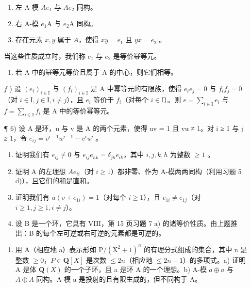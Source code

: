 \begin{enumerate}
\def\labelenumi{(\roman{enumi})}
\item
  左 A-模 \(Ae_{1}\) 与 \(Ae_{2}\) 同构。
\item
  右 A-模 \(e_1\mathrm{A}\) 与 \(e_2\mathrm{A}\) 同构。
\item
  存在元素 \(x, y\) 属于 \(A\)，使得 \(xy = e_1\) 且 \(yx = e_2\) 。
\end{enumerate}

当这些性质成立时，我们称 \(e_{1}\) 与 \(e_{2}\) 是等价幂等元。

\begin{enumerate}
\def\labelenumi{\alph{enumi})}
\setcounter{enumi}{4}
\tightlist
\item
  若 A 中的幂等元等价且属于 A 的中心，则它们相等。
\end{enumerate}

\(f\) ) 设 \((e_i)_{i\in \mathrm{I}}\) 与 \((f_{i})_{i\in \mathrm{I}}\) 是 A 中幂等元的有限族，使得 \(e_i e_j = 0\) 与 \(f_{i} f_{j} = 0\)（对 \(i\in \mathrm{I}, j\in \mathrm{I}, i\neq j\)），且 \(e_i\) 等价于 \(f_{i}\)（对每个 \(i\in \mathrm{I}\)）。则 \(e = \sum_{i\in \mathrm{I}}e_i\) 与 \(f = \sum_{i\in \mathrm{I}}f_{i}\) 是 A 中的等价幂等元。

¶ 6) 设 A 是环，u 与 v 是 A 的两个元素，使得 uv = 1 且 vu ≠ 1。对 i ≥ 1 与 j ≥ 1，令 \(e_{ij} = v^{i-1}u^{j-1} - v^i u^j\) 。

\begin{enumerate}
\def\labelenumi{\alph{enumi})}
\item
  证明我们有 \(e_{ij} \neq 0\) 与 \(e_{ij}e_{hk} = \delta_{jh}e_{ik}\)，其中 \(i,j,k,h\) 为整数 \(\geqslant 1\) 。
\item
  证明 A 的左理想 \(Ae_{ii}\)（对 \(i \geqslant 1\)）都非零、作为 A-模两两同构（利用习题 5 d)），且它们的和是直和。
\item
  证明我们有 \(u(v + e_{1i}) = 1\)（对每个 \(i \geqslant 1\)），且 \(e_{1i} \neq e_{1j}\)（对 \(i \geqslant 1, j \geqslant 1, i \neq j\)）。
\item
  设 B 是一个环，它具有 VIII，第 15 页习题 7 a) 的诸等价性质。由上题推出：B 的每个左可逆或右可逆的元素都是可逆的。
\end{enumerate}

\begin{enumerate}
\def\labelenumi{\arabic{enumi})}
\setcounter{enumi}{6}
\tightlist
\item
  用 A（相应地 a）表示形如 \(\mathrm{P}/(\mathrm{X}^{2}+1)^{n}\) 的有理分式组成的集合，其中 n 是整数 \(\geqslant0\)，\(P\in \mathbf{Q}[X]\) 是次数 \(\leqslant2n\)（相应地 \(\leqslant2n-1\)）的多项式。a) 证明 A 是体 \(\mathbf{Q}(X)\) 的一个子环，且 a 是环 A 的一个理想。b) A-模 \(a\oplus a\) 与 \(A\oplus A\) 同构。A-模 a 是投射的且有限生成的，但不同构于 A。
\end{enumerate}

